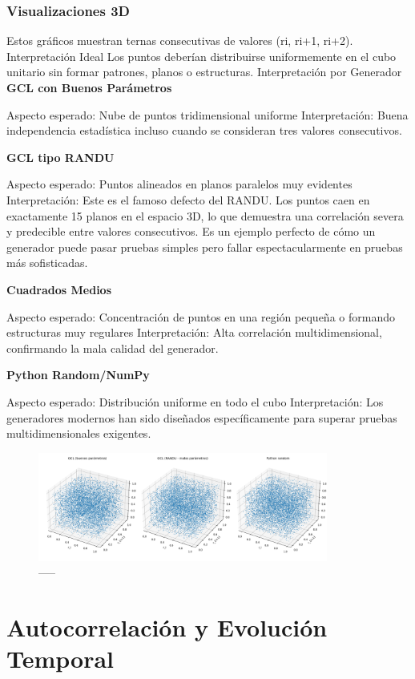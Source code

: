 \documentclass{article}
\begin{document}
\subsubsection{Visualizaciones 3D}
Estos gráficos muestran ternas consecutivas de valores (ri, ri+1, ri+2).
Interpretación Ideal
Los puntos deberían distribuirse uniformemente en el cubo unitario sin formar patrones, planos o estructuras.
Interpretación por Generador
\textbf{GCL con Buenos Parámetros}

Aspecto esperado: Nube de puntos tridimensional uniforme
Interpretación: Buena independencia estadística incluso cuando se consideran tres valores consecutivos.

\textbf{GCL tipo RANDU}

Aspecto esperado: Puntos alineados en planos paralelos muy evidentes
Interpretación: Este es el famoso defecto del RANDU. Los puntos caen en exactamente 15 planos en el espacio 3D, lo que demuestra una correlación severa y predecible entre valores consecutivos. Es un ejemplo perfecto de cómo un generador puede pasar pruebas simples pero fallar espectacularmente en pruebas más sofisticadas.

\textbf{Cuadrados Medios}

Aspecto esperado: Concentración de puntos en una región pequeña o formando estructuras muy regulares
Interpretación: Alta correlación multidimensional, confirmando la mala calidad del generador.

\textbf{Python Random/NumPy}

Aspecto esperado: Distribución uniforme en todo el cubo
Interpretación: Los generadores modernos han sido diseñados específicamente para superar pruebas multidimensionales exigentes.

\begin{figure}[H]
\centering
\includegraphics[width=0.85\textwidth]{Imagenes/comparacion_3d.png}
\caption{-----}
\end{figure}

\section{Autocorrelación y Evolución Temporal}
\end{document}
